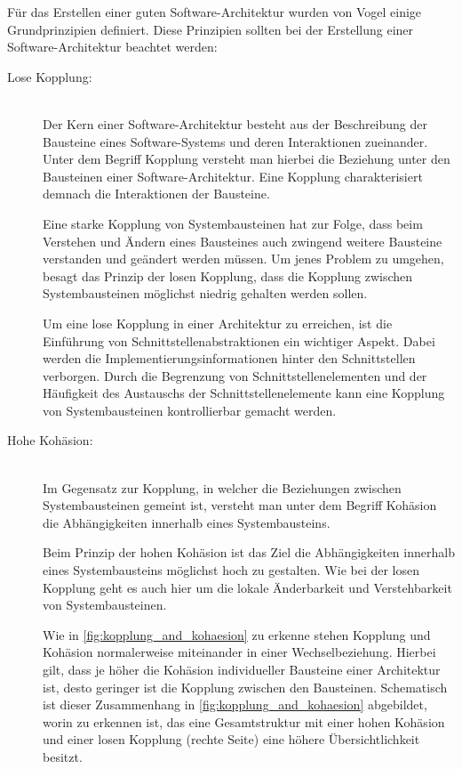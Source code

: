 Für das Erstellen einer guten Software-Architektur wurden von Vogel \cite{Vogel.2009} einige Grundprinzipien definiert. Diese Prinzipien sollten bei der Erstellung einer Software-Architektur beachtet werden: \cite{Vogel.2009}

\begin{description}
    \item[Lose Kopplung:]\hfill \\
    Der Kern einer Software-Architektur besteht aus der Beschreibung der Bausteine eines Software-Systems und deren Interaktionen zueinander. Unter dem Begriff Kopplung versteht man hierbei die Beziehung unter den Bausteinen einer Software-Architektur. Eine Kopplung charakterisiert demnach die Interaktionen der Bausteine.

    Eine starke Kopplung von Systembausteinen hat zur Folge, dass beim Verstehen und Ändern eines Bausteines auch zwingend weitere Bausteine verstanden und geändert werden müssen. Um jenes Problem zu umgehen, besagt das Prinzip der losen Kopplung, dass die Kopplung zwischen Systembausteinen möglichst niedrig gehalten werden sollen.

    Um eine lose Kopplung in einer Architektur zu erreichen, ist die Einführung von Schnittstellenabstraktionen ein wichtiger Aspekt. Dabei werden die Implementierungsinformationen hinter den Schnittstellen verborgen. Durch die Begrenzung von Schnittstellenelementen und der Häufigkeit des Austauschs der Schnittstellenelemente kann eine Kopplung von Systembausteinen kontrollierbar gemacht werden.

    \item[Hohe Kohäsion:]\hfill \\
    Im Gegensatz zur Kopplung, in welcher die Beziehungen zwischen Systembausteinen gemeint ist, versteht man unter dem Begriff Kohäsion die Abhängigkeiten innerhalb eines Systembausteins.

    Beim Prinzip der hohen Kohäsion ist das Ziel die Abhängigkeiten innerhalb eines Systembausteins möglichst hoch zu gestalten. Wie bei der losen Kopplung geht es auch hier um die lokale Änderbarkeit und Verstehbarkeit von Systembausteinen.
    
    Wie in \autoref{fig:kopplung_and_kohaesion} zu erkenne stehen Kopplung und Kohäsion normalerweise miteinander in einer Wechselbeziehung. Hierbei gilt, dass je höher die Kohäsion individueller Bausteine einer Architektur ist, desto geringer ist die Kopplung zwischen den Bausteinen. Schematisch ist dieser Zusammenhang in \autoref{fig:kopplung_and_kohaesion} abgebildet, worin zu erkennen ist, das eine Gesamtstruktur mit einer hohen Kohäsion und einer losen Kopplung (rechte Seite) eine höhere Übersichtlichkeit besitzt.


\end{description}
